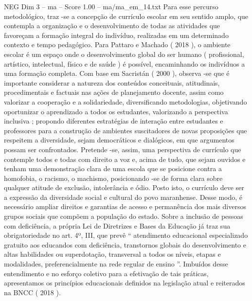 \begin{textsample}{NEG Dim 3 – ma – Score 1.00 – ma/ma\_em\_14.txt}
Para esse percurso metodológico, traz -se a concepção de currículo escolar em seu sentido amplo, que contempla a organização e o desenvolvimento de todas as atividades que favoreçam a formação integral do indivíduo, realizadas em um determinado contexto e tempo pedagógico.
Para Pattaro e Machado ( 2018 ), o ambiente escolar é um espaço onde o desenvolvimento global do ser humano ( profissional, artístico, intelectual, físico e de saúde ) é possível, encaminhando os indivíduos a uma formação completa.
Com base em Sacristán ( 2000 ), observa -se que é importante considerar a natureza dos conteúdos conceituais, atitudinais, procedimentais e factuais nas ações de planejamento docente, assim como valorizar a cooperação e a solidariedade, diversificando metodologias, objetivando oportunizar o aprendizado a todos os estudantes, valorizando a perspectiva inclusiva ; propondo diferentes estratégias de interação entre estudantes e professores para a construção de ambientes suscitadores de novas proposições que respeitem a diversidade, sejam democráticos e dialógicos, em que argumentos possam ser confrontados.
Pretende -se, assim, uma perspectiva de currículo que contemple todos e todas com direito a voz e, acima de tudo, que sejam ouvidos e tenham uma demonstração clara de uma escola que se posicione contra a homofobia, o racismo, o machismo, posicionando -se de forma clara sobre qualquer atitude de exclusão, intolerância e ódio.
Posto isto, o currículo deve ser a expressão da diversidade social e cultural do povo maranhense.
Desse modo, é necessário ampliar direitos e garantias de acesso e permanência dos mais diversos grupos sociais que compõem a população do estado.
Sobre a inclusão de pessoas com deficiência, a própria Lei de Diretrizes e Bases da Educação já traz sua obrigatoriedade no art. 4º, III, que prevê “ atendimento educacional especializado gratuito aos educandos com deficiência, transtornos globais do desenvolvimento e altas habilidades ou superdotação, transversal a todos os níveis, etapas e modalidades, preferencialmente na rede regular de ensino ”.
Imbuídos desse entendimento e no esforço coletivo para a efetivação de tais práticas, apresentamos os princípios educacionais definidos na legislação atual e reiterados na BNCC ( 2018 ).

\end{textsample}
